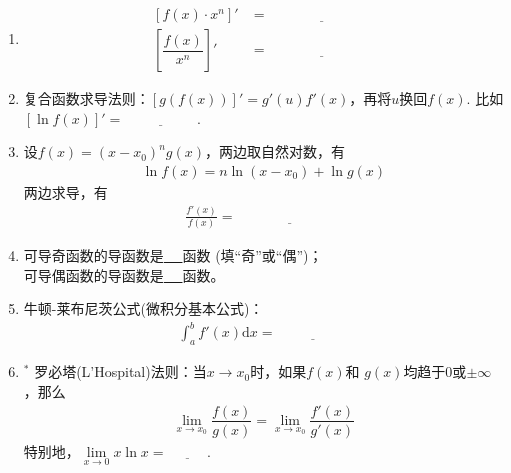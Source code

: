 \documentclass{article}
\newif\ifte
\renewcommand{\d}{\mathrm{d}}
\begin{document}
\begin{multicols}{2}
\begin{enumerate}[leftmargin=20pt]
\item 
\begin{align*}
    \left[f(x)\cdot x^n \right]'&= \underline{\ 
      \ifte x^n f'(x)+nx^{n-1}f(x) \else \hspace{3cm} \fi\ } \\
    \left[ \dfrac{f(x)}{x^n}\right]' &=\underline{\ 
      \ifte \dfrac{xf'(x)-nf(x)}{x^{n+1}} \else \hspace{3cm} \fi\ }
\end{align*}


\item 复合函数求导法则：$ [g(f(x))]'=g'(u)f'(x) $，再将$ u $换回$ f(x) $. 
比如$ [\ln f(x)]'=\underline{\ \ifte \dfrac{f'(x)}{f(x)}
\else \hspace{2cm} \fi\ } $.

\item 设$ f(x)=(x-x_0)^ng(x) $，两边取自然对数，有
\begin{gather*}
    \ln f(x) =n\ln(x-x_0)+\ln g(x)
\end{gather*}
两边求导，有
\begin{align*}
    \frac{f'(x)}{f(x)} =\underline{\ \ifte 
    \frac{n}{x-x_0}+\frac{g'(x)}{g(x)}\else \hspace{3cm} \fi\ }
\end{align*}

\item 可导奇函数的导函数是\underline{\ \ifte 偶\else \hspace{0.5cm} \fi\ }函数
\ifte \else (填“奇”或“偶”)\fi；\\
可导偶函数的导函数是\underline{\ \ifte 奇\else \hspace{0.5cm} \fi\ }函数。

\item 牛顿-莱布尼茨公式(微积分基本公式)：
\begin{gather*}
    \int_a^bf'(x)\d x=\underline{\ \ifte 
        f(b)-f(a)\else \hspace{2cm} \fi\ }
\end{gather*}

\item $^*$ 罗必塔(L'Hospital)法则：当$ x\to x_0 $时，如果$ f(x) $和
$ g(x) $均趋于0或$ \pm \infty $，那么
\begin{gather*}
    \lim\limits_{x\to x_0}\dfrac{f(x)}{g(x)}=
    \lim\limits_{x\to x_0}\dfrac{f'(x)}{g'(x)}
\end{gather*}
特别地，$ \lim\limits_{x\to 0} x\ln x=\underline{\ 
    \ifte 0\else \hspace{1cm} \fi\ } $.


\end{enumerate}
\end{multicols}
\end{document}
